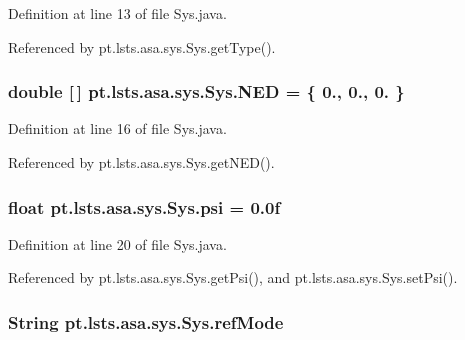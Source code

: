 Definition at line 13 of file Sys.\+java.



Referenced by pt.\+lsts.\+asa.\+sys.\+Sys.\+get\+Type().

\hypertarget{classpt_1_1lsts_1_1asa_1_1sys_1_1Sys_a8a7eb29a9dfdc5a62012b81859932847}{}
\subsubsection[{N\+E\+D}]{\setlength{\rightskip}{0pt plus 5cm}double \mbox{[}$\,$\mbox{]} pt.\+lsts.\+asa.\+sys.\+Sys.\+N\+E\+D = \{ 0., 0., 0. \}\hspace{0.3cm}{\ttfamily [private]}}\label{classpt_1_1lsts_1_1asa_1_1sys_1_1Sys_a8a7eb29a9dfdc5a62012b81859932847}


Definition at line 16 of file Sys.\+java.



Referenced by pt.\+lsts.\+asa.\+sys.\+Sys.\+get\+N\+E\+D().

\hypertarget{classpt_1_1lsts_1_1asa_1_1sys_1_1Sys_a23d5b791a79a3e5b8863d35ee9dd21c7}{}
\subsubsection[{psi}]{\setlength{\rightskip}{0pt plus 5cm}float pt.\+lsts.\+asa.\+sys.\+Sys.\+psi = 0.\+0f\hspace{0.3cm}{\ttfamily [private]}}\label{classpt_1_1lsts_1_1asa_1_1sys_1_1Sys_a23d5b791a79a3e5b8863d35ee9dd21c7}


Definition at line 20 of file Sys.\+java.



Referenced by pt.\+lsts.\+asa.\+sys.\+Sys.\+get\+Psi(), and pt.\+lsts.\+asa.\+sys.\+Sys.\+set\+Psi().

\hypertarget{classpt_1_1lsts_1_1asa_1_1sys_1_1Sys_aefcbaa46921015c924311d0a2d3dbbe0}{}
\subsubsection[{ref\+Mode}]{\setlength{\rightskip}{0pt plus 5cm}String pt.\+lsts.\+asa.\+sys.\+Sys.\+ref\+Mode\hspace{0.3cm}{\ttfamily [private]}}\label{classpt_1_1lsts_1_1asa_1_1sys_1_1Sys_aefcbaa46921015c924311d0a2d3dbbe0}


